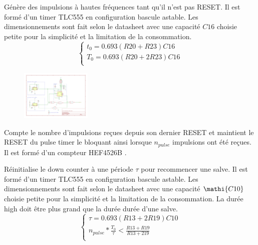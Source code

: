 \documentclass[french]{layout/Report}
\begin{document}
\begin{description}[leftmargin=!,labelwidth=3cm, labelindent=\parindent]
	\item[Pulse timer] Génère des impulsions à hautes fréquences tant qu'il n'est pas RESET. Il est formé d'un timer TLC555 en configuration bascule astable. Les dimensionnements sont fait selon le datasheet \cite{TLC555} avec une capacité $\mathit{C16}$ choisie petite pour la simplicité et la limitation de la consommation.
		\begin{equation*}
			\begin{cases}
				t_0 = 0.693(\mathit{R20}+\mathit{R23})\mathit{C16} \\
				T_0 = 0.693(\mathit{R20}+2\mathit{R23})\mathit{C16} \\
			\end{cases}
		\end{equation*}

        \begin{figure}[H]
        \centering
        \includegraphics[width=0.3\textwidth]{fig/pulse_timer.pdf}
        \end{figure}

	\item[Down counter] Compte le nombre d'impulsions reçues depuis son dernier RESET et maintient le RESET du pulse timer le bloquant ainsi lorsque $n_{pulse}$ impulsions ont été reçues. Il est formé d'un compteur HEF4526B \cite{HEF4526B}.

	\item[Burst timer] Réinitialise le down counter à une période $\tau$ pour recommencer une salve. Il est formé d'un timer TLC555 en configuration bascule astable. Les dimensionnements sont fait selon le datasheet \cite{TLC555} avec une capacité $\mathi{C10}$ choisie petite pour la simplicité et la limitation de la consommation. La durée high doit être plus grand que la durée durée d'une salve.
		\begin{equation*}
			\begin{cases}
				\tau = 0.693(\mathit{R13}+2\mathit{R19})\mathit{C10} \\
				n_{pulse}*\frac{T_0}{\tau} < \frac{\mathit{R13}+\mathit{R19}}{\mathit{R13}+2\mathit{19}} \\
			\end{cases}
		\end{equation*}


\end{description}
\end{document}
